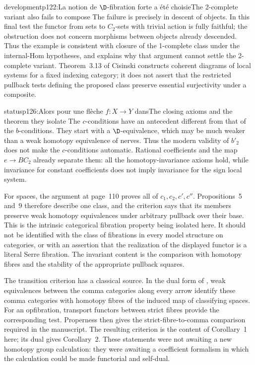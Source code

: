 \begin{dcomment}{development}{p122:La notion de $\D$-fibration forte a été choisie}{The 2-complete variant also fails to compose}
The failure is precisely in descent of objects. In this final test the functor from sets to $C_2$-sets with trivial action is fully faithful; the obstruction does not concern morphisms between objects already descended. Thus the example is consistent with closure of the 1-complete class under the internal-Hom hypotheses, and explains why that argument cannot settle the 2-complete variant. Theorem~3.13 of Cisinski constructs coherent diagrams of local systems for a fixed indexing category; it does not assert that the restricted pullback tests defining the proposed class preserve essential surjectivity under a composite.
\end{dcomment}

\begin{dcomment}{status}{p126:Alors pour une flèche $f : X \to Y$ dans}{The closing axioms and the theorem they isolate}
The $c$-conditions have an antecedent different from that of the $b$-conditions. They start with a $\D$-equivalence, which may be much weaker than a weak homotopy equivalence of nerves. Thus the modern validity of $b'_2$ does not make the $c$-conditions automatic. Rational coefficients and the map $e\to BC_2$ already separate them: all the homotopy-invariance axioms hold, while invariance for constant coefficients does not imply invariance for the sign local system.

For spaces, the argument at page~110 proves all of $c_1,c_2,c',c''$. Propositions~5 and~9 therefore describe one class, and the criterion says that its members preserve weak homotopy equivalences under arbitrary pullback over their base. This is the intrinsic categorical fibration property being isolated here. It should not be identified with the class of fibrations in every model structure on categories, or with an assertion that the realization of the displayed functor is a literal Serre fibration. The invariant content is the comparison with homotopy fibres and the stability of the appropriate pullback squares.

The transition criterion has a classical source. In the dual form of \citet[\S1, Theorem~B and its corollary]{Quillen1973}, weak equivalences between the comma categories along every arrow identify these comma categories with homotopy fibres of the induced map of classifying spaces. For an opfibration, transport functors between strict fibres provide the corresponding test. Properness then gives the strict-fibre-to-comma comparison required in the manuscript. The resulting criterion is the content of Corollary~1 here; its dual gives Corollary~2. These statements were not awaiting a new homotopy group calculation: they were awaiting a coefficient formalism in which the calculation could be made functorial and self-dual.


\end{dcomment}

